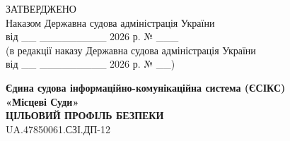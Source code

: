 \documentclass[10pt]{article}
\begin{document}
\begin{flushright}
ЗАТВЕРДЖЕНО\\
Наказом Державна судова адміністрація України\\
від \_\_ \_\_\_\_\_\_\_\_\_ 2026 р. № \_\_\_\\
(в редакції наказу Державна судова адміністрація України\\
від \_\_ \_\_\_\_\_\_\_\_\_ 2026 р. № \_\_)
\end{flushright}

\vspace{2cm}

\begin{center}
\textbf{\Large Єдина судова інформаційно-комунікаційна система (ЄСІКС)}\\
\textbf{\Large «Місцеві Суди»}\\
\vspace{1cm}
\textbf{\Large ЦІЛЬОВИЙ ПРОФІЛЬ БЕЗПЕКИ}\\
\vspace{0.5cm}
\large UA.47850061.СЗІ.ДП-12
\end{center}

\newpage
\end{document}
